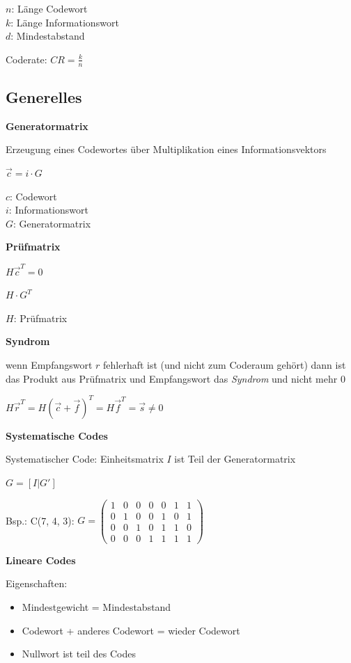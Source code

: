 $n$: Länge Codewort\\
$k$: Länge Informationswort\\
$d$: Mindestabstand

Coderate: 
$\displaystyle{
    CR = \frac{k}{n}
}$

\subsection{Generelles}

\textbf{Generatormatrix}

Erzeugung eines Codewortes über Multiplikation eines Informationsvektors

$\displaystyle{
    \vec{c} = i \cdot G
}$

$c$: Codewort\\
$i$: Informationswort\\
$G$: Generatormatrix

\textbf{Prüfmatrix}

$\displaystyle{
    H \vec{c}^T = 0
}$

$\displaystyle{
    H \cdot G^T
}$

$H$: Prüfmatrix

\textbf{Syndrom}

wenn Empfangswort $r$ fehlerhaft ist (und nicht zum Coderaum gehört) dann ist das Produkt aus
Prüfmatrix und Empfangswort das \textit{Syndrom} und nicht mehr 0

$\displaystyle{
    H \vec{r}^T = H (\vec{c} + \vec{f})^T = H \vec{f}^T = \vec{s} \neq 0
}$

\textbf{Systematische Codes}

Systematischer Code: Einheitsmatrix $I$ ist Teil der Generatormatrix

$\displaystyle{
    G = [I | G']
}$

Bsp.: C(7, 4, 3): 
$\displaystyle{
    G =
    \begin{pmatrix}
        1 & 0 & 0 & 0 & 0 & 1 & 1\\
        0 & 1 & 0 & 0 & 1 & 0 & 1\\
        0 & 0 & 1 & 0 & 1 & 1 & 0\\
        0 & 0 & 0 & 1 & 1 & 1 & 1
    \end{pmatrix}
}$

\textbf{Lineare Codes}

Eigenschaften:
\begin{itemize}
    \item Mindestgewicht = Mindestabstand
    \item Codewort + anderes Codewort = wieder Codewort
    \item Nullwort ist teil des Codes
\end{itemize}


